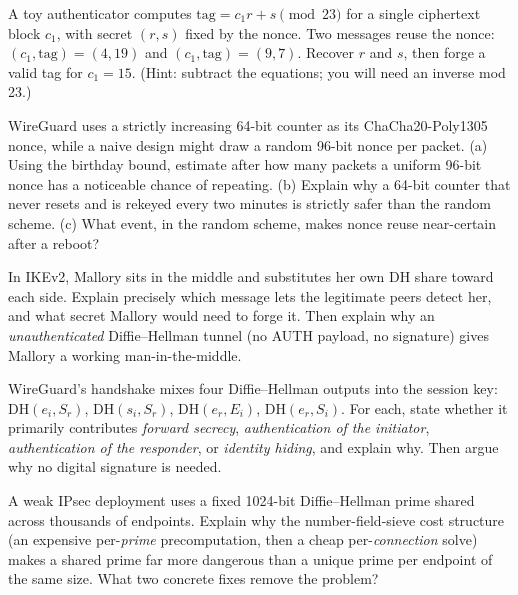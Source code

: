 \begin{exercise}
A toy authenticator computes \(\mathrm{tag} = c_1 r + s \pmod{23}\) for a single ciphertext block \(c_1\), with secret \((r,s)\) fixed by the nonce. Two messages reuse the nonce: \((c_1, \mathrm{tag}) = (4, 19)\) and \((c_1,\mathrm{tag})=(9, 7)\). Recover \(r\) and \(s\), then forge a valid tag for \(c_1 = 15\). (Hint: subtract the equations; you will need an inverse mod 23.)
\end{exercise}

\begin{exercise}
WireGuard uses a strictly increasing 64-bit counter as its ChaCha20-Poly1305 nonce, while a naive design might draw a random 96-bit nonce per packet. (a) Using the birthday bound, estimate after how many packets a uniform 96-bit nonce has a noticeable chance of repeating. (b) Explain why a 64-bit counter that never resets and is rekeyed every two minutes is strictly safer than the random scheme. (c) What event, in the random scheme, makes nonce reuse near-certain after a reboot?
\end{exercise}

\begin{exercise}
In IKEv2, Mallory sits in the middle and substitutes her own DH share toward each side. Explain precisely which message lets the legitimate peers detect her, and what secret Mallory would need to forge it. Then explain why an \emph{unauthenticated} Diffie--Hellman tunnel (no AUTH payload, no signature) gives Mallory a working man-in-the-middle.
\end{exercise}

\begin{exercise}
WireGuard's handshake mixes four Diffie--Hellman outputs into the session key: \(\mathrm{DH}(e_i,S_r)\), \(\mathrm{DH}(s_i,S_r)\), \(\mathrm{DH}(e_r,E_i)\), \(\mathrm{DH}(e_r,S_i)\). For each, state whether it primarily contributes \emph{forward secrecy}, \emph{authentication of the initiator}, \emph{authentication of the responder}, or \emph{identity hiding}, and explain why. Then argue why no digital signature is needed.
\end{exercise}

\begin{exercise}
A weak IPsec deployment uses a fixed 1024-bit Diffie--Hellman prime shared across thousands of endpoints. Explain why the number-field-sieve cost structure (an expensive per-\emph{prime} precomputation, then a cheap per-\emph{connection} solve) makes a shared prime far more dangerous than a unique prime per endpoint of the same size. What two concrete fixes remove the problem?
\end{exercise}

